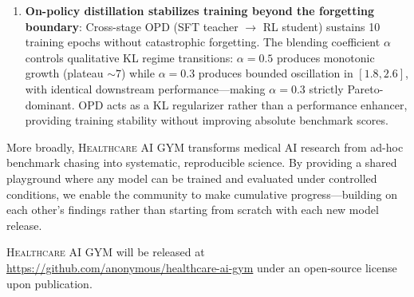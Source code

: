 \documentclass{article}
\newcommand{\gym}{\textsc{Healthcare AI GYM}}
\begin{document}
\begin{enumerate}[nosep, leftmargin=*]
    \item \textbf{On-policy distillation stabilizes training beyond the forgetting boundary}: Cross-stage OPD (SFT teacher $\to$ RL student) sustains 10 training epochs without catastrophic forgetting. The blending coefficient $\alpha$ controls qualitative KL regime transitions: $\alpha{=}0.5$ produces monotonic growth (plateau ${\sim}7$) while $\alpha{=}0.3$ produces bounded oscillation in $[1.8, 2.6]$, with identical downstream performance---making $\alpha{=}0.3$ strictly Pareto-dominant. OPD acts as a KL regularizer rather than a performance enhancer, providing training stability without improving absolute benchmark scores.
\end{enumerate}

More broadly, \gym{} transforms medical AI research from ad-hoc benchmark chasing into systematic, reproducible science. By providing a shared playground where any model can be trained and evaluated under controlled conditions, we enable the community to make cumulative progress---building on each other's findings rather than starting from scratch with each new model release.

\gym{} will be released at \url{https://github.com/anonymous/healthcare-ai-gym} under an open-source license upon publication.


\end{document}
